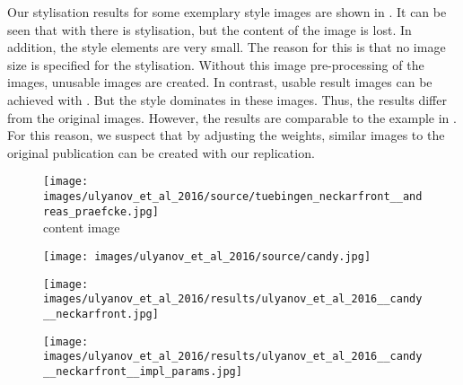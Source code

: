 Our stylisation results for some exemplary style images are shown in . It can be seen that with \paper{} there is stylisation, but the content of the image is lost. In addition, the style elements are very small. The reason for this is that no image size is specified for the stylisation. Without this image pre-processing of the images, unusable images are created. In contrast, usable result images can be achieved with \implementation{}. But the style dominates in these images. Thus, the results differ from the original images. However, the results are comparable to the example in . For this reason, we suspect that by adjusting the weights, similar images to the original publication can be created with our replication.
\begin{figure}[H]
	\centering
	\begin{minipage}[t]{0.24\textwidth}
		\centering
		\texttt{[image: images/ulyanov\_et\_al\_2016/source/tuebingen\_neckarfront\_\_andreas\_praefcke.jpg]}\\
		content image
	\end{minipage}
	\hfill%
	\begin{minipage}[t]{0.24\textwidth}
		\centering
		\hfill
	\end{minipage}
	\hfill%
	\begin{minipage}[t]{0.24\textwidth}
		\centering
		\hfill
	\end{minipage}
	\hfill%
	\begin{minipage}[t]{0.24\textwidth}
		\centering
		\hfill
	\end{minipage}
	\hfill%
	\begin{minipage}[t]{0.24\textwidth}
		\centering
		\texttt{[image: images/ulyanov\_et\_al\_2016/source/candy.jpg]}
	\end{minipage}
	\hfill%
	\begin{minipage}[t]{0.24\textwidth}
		\centering
		\texttt{[image: images/ulyanov\_et\_al\_2016/results/ulyanov\_et\_al\_2016\_\_candy\_\_neckarfront.jpg]}
	\end{minipage}
	\hfill%
	\begin{minipage}[t]{0.24\textwidth}
		\centering
		\texttt{[image: images/ulyanov\_et\_al\_2016/results/ulyanov\_et\_al\_2016\_\_candy\_\_neckarfront\_\_impl\_params.jpg]}
	\end{minipage}
	\hfill%
	\\
	\begin{minipage}[t]{0.24\textwidth}
		\centering

\end{minipage}
\end{figure}

